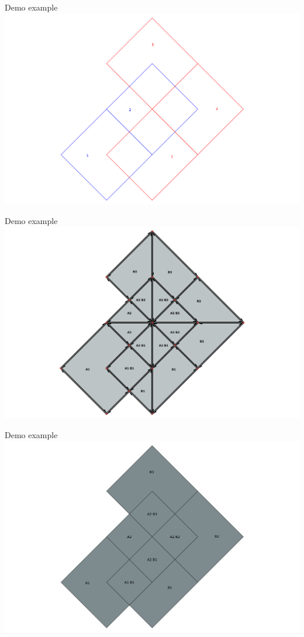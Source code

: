 \documentclass{beamer}
\begin{document}
\begin{frame}{Demo example}
    \centering 
    \includegraphics[width=\linewidth]{figures/Demo01} 
\end{frame}

\begin{frame}{Demo example}
    \centering 
    \includegraphics[width=\linewidth]{figures/Demo02} 
\end{frame}

\begin{frame}{Demo example}
    \centering 
    \includegraphics[width=\linewidth]{figures/Demo03} 
\end{frame}
\end{document}
